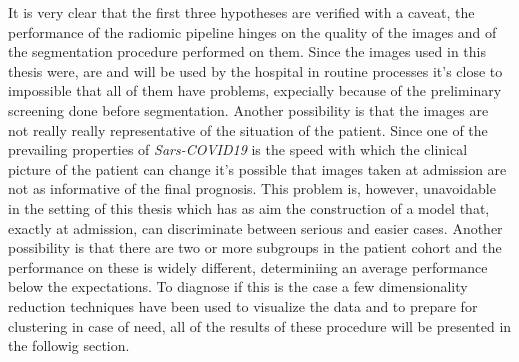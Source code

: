 It is very clear that the first three hypotheses are verified with a caveat, the performance of the radiomic pipeline hinges on the quality of the images and of the segmentation procedure performed on them. Since the images used in this thesis were, are and will be used by the hospital in routine processes it's close to impossible that all of them have problems, expecially because of the preliminary screening done before segmentation.
Another possibility is that the images are not really really representative of the situation of the patient. Since one of the prevailing properties of \textit{Sars-COVID19} is the speed with which the clinical picture of the patient can change it's possible that images taken at admission are not as informative of the final prognosis. This problem is, however, unavoidable in the setting of this thesis which has as aim the construction of a model that, exactly at admission, can discriminate between serious and easier cases.
Another possibility is that there are two or more subgroups in the patient cohort and the performance on these is widely different, determiniing an average performance below the expectations.
To diagnose if this is the case a few dimensionality reduction techniques have been used to visualize the data and to prepare for clustering in case of need, all of the results of these procedure will be presented in the followig section.
